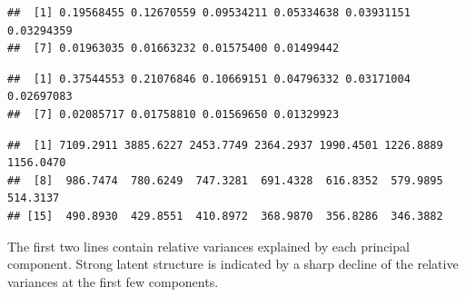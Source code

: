 \documentclass[]{article}
\newenvironment{Shaded}{\begin{snugshade}}{\end{snugshade}}
\newcommand{\KeywordTok}[1]{\textcolor[rgb]{0.13,0.29,0.53}{\textbf{{#1}}}}
\newcommand{\DecValTok}[1]{\textcolor[rgb]{0.00,0.00,0.81}{{#1}}}
\newcommand{\StringTok}[1]{\textcolor[rgb]{0.31,0.60,0.02}{{#1}}}
\newcommand{\NormalTok}[1]{{#1}}
\begin{document}
\begin{Shaded}
\end{Shaded}

\begin{verbatim}
##  [1] 0.19568455 0.12670559 0.09534211 0.05334638 0.03931151 0.03294359
##  [7] 0.01963035 0.01663232 0.01575400 0.01499442
\end{verbatim}

\begin{Shaded}
\end{Shaded}

\begin{verbatim}
##  [1] 0.37544553 0.21076846 0.10669151 0.04796332 0.03171004 0.02697083
##  [7] 0.02085717 0.01758810 0.01569650 0.01329923
\end{verbatim}

\begin{Shaded}
\end{Shaded}

\begin{verbatim}
##  [1] 7109.2911 3885.6227 2453.7749 2364.2937 1990.4501 1226.8889 1156.0470
##  [8]  986.7474  780.6249  747.3281  691.4328  616.8352  579.9895  514.3137
## [15]  490.8930  429.8551  410.8972  368.9870  356.8286  346.3882
\end{verbatim}

The first two lines contain relative variances explained by each
principal component. Strong latent structure is indicated by a sharp
decline of the relative variances at the first few components.
\end{document}
